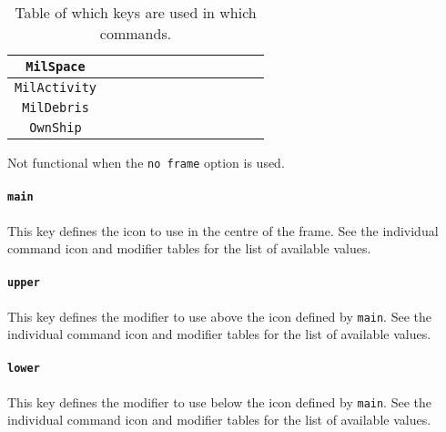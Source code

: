 \documentclass[a4paper, titlepage]{article}
\begin{document}
\begin{table}[H]
\begin{tabular}{|c|c|c|c|c|c|c|c|c|c|c|c|}
\texttt{MilSpace} &  &  &  &  &  &  &  &  \cellcolor{black} &  & \cellcolor{black} & \cellcolor{black}\\ \hline
\texttt{MilActivity} &  &  &  &  &  &  &  & \cellcolor{black} &  \cellcolor{black} &  & \cellcolor{black}\\ \hline
\texttt{MilDebris} & \cellcolor{black} & \cellcolor{black} & \cellcolor{black} & \cellcolor{black} & \cellcolor{black} & \cellcolor{black} & \cellcolor{black} &  \cellcolor{black} & \cellcolor{black} & \cellcolor{black} & \cellcolor{black}\\ \hline
\texttt{OwnShip} & \cellcolor{black} & \cellcolor{black} & \cellcolor{black} & \cellcolor{black} & \cellcolor{black} & \cellcolor{black} & \cellcolor{black} &  \cellcolor{black} & \cellcolor{black} & \cellcolor{black} & \cellcolor{black}\\ \hline
\end{tabular}
\begin{tablenotes}
\item \qquad *Not functional when the \texttt{no frame} option is used.
\end{tablenotes}
\caption{Table of which keys are used in which commands.}
\label{shared}
\end{table}

\paragraph{\texttt{main}}

This key defines the icon to use in the centre of the frame. See the individual command icon and modifier tables for the list of available values.

\paragraph{\texttt{upper}} 

This key defines the modifier to use above the icon defined by \texttt{main}. See the individual command icon and modifier tables for the list of available values.

\paragraph{\texttt{lower}} 

This key defines the modifier to use below the icon defined by \texttt{main}. See the individual command icon and modifier tables for the list of available values.
\end{document}
